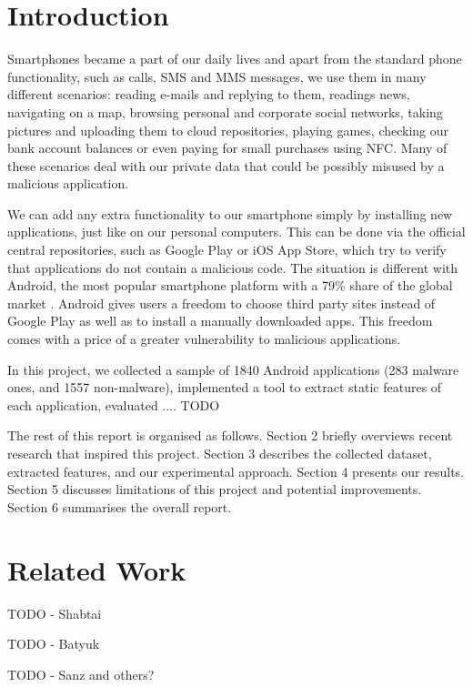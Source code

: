 \section{Introduction}
Smartphones became a part of our daily lives and apart from the standard phone functionality, such as calls, SMS and MMS messages, we use them in many different scenarios: reading e-mails and replying to them, readings news, navigating on a map, browsing personal and corporate social networks, taking pictures and uploading them to cloud repositories, playing games, checking our bank account balances or even paying for small purchases using NFC. Many of these scenarios deal with our private data that could be possibly misused by a malicious application.

We can add any extra functionality to our smartphone simply by installing new applications, just like on our personal computers. This can be done via the official central repositories, such as Google Play  \cite{google_play} or iOS App Store, which try to verify that applications do not contain a malicious code. The situation is different with Android, the most popular smartphone platform with a 79\% share of the global market \cite{idc}. Android gives users a freedom to choose third party sites instead of Google Play as well as to install a manually downloaded apps. This freedom comes with a price of a greater vulnerability to malicious applications.

In this project, we collected a sample of 1840 Android applications (283 malware ones, and 1557 non-malware), implemented a tool to extract static features of each application, evaluated .... TODO

The rest of this report is organised as follows. Section 2 briefly overviews recent research that inspired this project. Section 3 describes the collected dataset, extracted features, and our experimental approach. Section 4 presents our results. Section 5 discusses limitations of this project and potential improvements. Section 6 summarises the overall report.

\section{Related Work}
TODO - Shabtai \cite{shabtai_2010}

TODO - Batyuk \cite{batyuk_2011}

TODO - Sanz \cite{sanz_2012} and others?